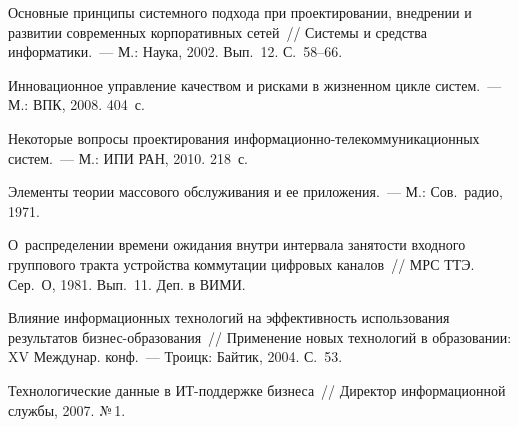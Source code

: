 \begin{multicols}{2}
\vspace*{-6pt}
    
{\small\frenchspacing
{%
\begin{thebibliography}{9}

Основные принципы сис\-тем\-но\-го подхода при проектировании, внедрении и 
развитии современных корпоративных сетей~// Системы и средства
 информатики.~--- М.: Наука, 2002. Вып.~12. С.~58--66.

Инновационное управление качеством и рисками в жизненном цикле сис\-тем.~--- М.: 
ВПК, 2008. 404~с.

Некоторые вопросы проектирования информационно-те\-ле\-ком\-му\-ни\-ка\-ционных 
сис\-тем.~--- М.: ИПИ РАН, 2010. 218~с.


Элементы теории массового обслуживания и ее приложения.~--- М.: Сов.\ 
радио, 1971.

О~распределении времени ожидания внутри интервала занятости входного 
группового тракта устройства коммутации цифровых каналов~// МРС ТТЭ. Сер.~О, 
1981. Вып.~11. Деп. в ВИМИ.

Влияние информационных технологий на эффективность использования результатов 
биз\-нес-обра\-зо\-ва\-ния~// Применение новых технологий в образовании: XV 
Междунар. конф.~--- Троицк: Байтик, 2004. С.~53.

\label{end\stat}

Технологические данные в ИТ-под\-держ\-ке бизнеса~// Директор информационной 
службы, 2007. №\,1.
 \end{thebibliography}
}
}


\end{multicols}       